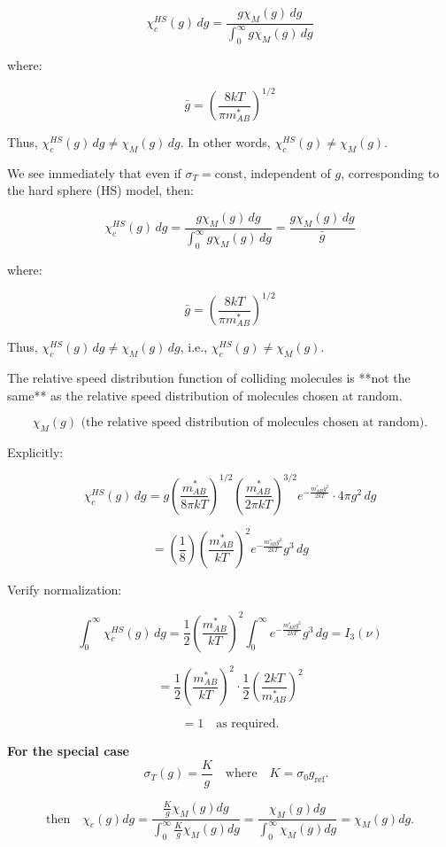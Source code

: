 \documentclass{article}
\begin{document}
\[
\chi_c^{HS}(g) \, dg = \frac{g \chi_M(g) \, dg}{\int_0^{\infty} g \chi_M(g) \, dg}
\]

where:

\[
\bar{g} = \left( \frac{8 k T}{\pi m_{AB}^*} \right)^{1/2}
\]

Thus, \( \chi_c^{HS}(g) \, dg \neq \chi_M(g) \, dg \). In other words, \( \chi_c^{HS}(g) \neq \chi_M(g) \).

We see immediately that even if \( \sigma_T = \text{const} \), independent of \( g \), corresponding to the hard sphere (HS) model, then:

\[
\chi_c^{HS}(g) \, dg = \frac{g \chi_M(g) \, dg}{\int_0^{\infty} g \chi_M(g) \, dg} = \frac{g \chi_M(g) \, dg}{\bar{g}}
\]

where:

\[
\bar{g} = \left( \frac{8 k T}{\pi m_{AB}^*} \right)^{1/2}
\]

Thus, \( \chi_c^{HS}(g) \, dg \neq \chi_M(g) \, dg \), i.e., \( \chi_c^{HS}(g) \neq \chi_M(g) \).

The relative speed distribution function of colliding molecules is **not the same** as the relative speed distribution of molecules chosen at random.

\[
\chi_M(g) \text{ (the relative speed distribution of molecules chosen at random)}.
\]

Explicitly:

\[
\chi_c^{HS}(g) \, dg = g \left( \frac{m_{AB}^*}{8 \pi k T} \right)^{1/2} \left( \frac{m_{AB}^*}{2 \pi k T} \right)^{3/2} e^{-\frac{m_{AB}^* g^2}{2 k T}} \cdot 4 \pi g^2 \, dg
\]

\[
= \left( \frac{1}{8} \right) \left( \frac{m_{AB}^*}{k T} \right)^2 e^{-\frac{m_{AB}^* g^2}{2 k T}} g^3 \, dg
\]

Verify normalization:

\[
\int_0^{\infty} \chi_c^{HS}(g) \, dg = \frac{1}{2} \left( \frac{m_{AB}^*}{k T} \right)^2 \int_0^{\infty} e^{-\frac{m_{AB}^* g^2}{2 k T}} g^3 \, dg = I_3(\nu)
\]

\[
= \frac{1}{2} \left( \frac{m_{AB}^*}{k T} \right)^2 \cdot \frac{1}{2} \left( \frac{2 k T}{m_{AB}^*} \right)^2
\]

\[
= 1 \quad \text{as required}.
\]


\textbf{For the special case} $$\quad \sigma_T(g) = \frac{K}{g} \quad \text{where} \quad K = \sigma_0 g_{\text{ref}}.$$

\[
\text{then} \quad \chi_c(g) dg = \frac{\frac{K}{g} \chi_M(g) dg}{\int_0^\infty \frac{K}{g} \chi_M(g) dg}
= \frac{\chi_M(g) dg}{\int_0^\infty \chi_M(g) dg} = \chi_M(g) dg.
\]
\end{document}
